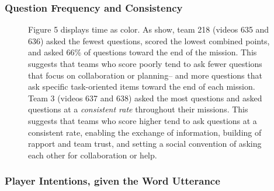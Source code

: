 \newpage

\subsubsection{Question Frequency and Consistency}




\begin{figure}[h!]
    \centering
    \caption{Figure 5 displays time as color. As show, team 218 (videos 635 and 636) asked the
fewest questions, scored the lowest combined points, and asked 66\%
of questions toward the end of the mission. This suggests that teams who score poorly tend to ask fewer questions that focus on collaboration or planning-- and more questions that ask specific task-oriented items toward the end of each mission. Team 3 (videos 637 and 638) asked the most questions and asked questions at a \emph{consistent rate} throughout their missions. This suggests that teams who score higher tend to ask questions at a consistent rate, enabling the exchange of information, building of rapport and team trust, and setting a social convention of asking each other for collaboration or help. }
\end{figure}








\newpage

\subsubsection{Player Intentions, given the Word Utterance}





